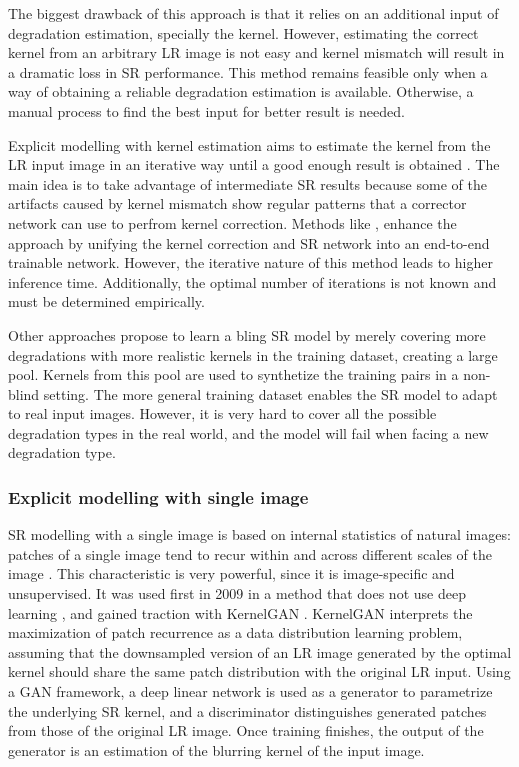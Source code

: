         The biggest drawback  of this approach is that it relies on an additional input of degradation estimation, specially the kernel. 
        However, estimating the correct kernel from an arbitrary LR image is not easy and kernel mismatch will result in a dramatic loss in SR performance.
        This method remains feasible only when a way of obtaining a reliable degradation estimation is available.
        Otherwise, a manual process to find the best input for better result is needed.
        
        Explicit modelling with kernel estimation aims to estimate the kernel from the LR input image in an iterative way until a good enough result is obtained \cite{gu2019blind}.
        The main idea is to take advantage of intermediate SR results because some of the artifacts caused by kernel mismatch show regular patterns that a corrector network can use to perfrom kernel correction.
        Methods like \cite{luo2020unfolding}, enhance the approach by unifying the kernel correction and SR network into an end-to-end trainable network. 
        However, the iterative nature of this method leads to higher inference time. Additionally, the optimal number of iterations is not known and must be determined empirically.

        Other approaches propose to learn a bling SR model by merely covering more degradations with more realistic kernels in the training dataset, creating a large pool.
        Kernels from this pool are used to synthetize the training pairs in a non-blind setting. 
        The more general training dataset enables the SR model to adapt to real input images. 
        However, it is very hard to cover all the possible degradation types in the real world, and the model will fail when facing a new degradation type.


        \subsubsection{Explicit modelling with single image}

        SR modelling with a single image is based on internal statistics of natural images: patches of a single image tend to recur within and across different scales of the image \cite{zontak2011}.
        This characteristic is very powerful, since it is image-specific and unsupervised. It was used first in 2009 in a method that does not use deep learning \cite{glasner2009}, and gained traction with KernelGAN \cite{bellkligler2020blind}. 
        KernelGAN interprets the maximization of patch recurrence as a data distribution learning problem, assuming that the downsampled version of an LR image generated by the optimal kernel should share the same patch distribution with the original LR input.
        Using a GAN framework, a deep linear network is used as a generator to parametrize the underlying SR kernel, and a discriminator distinguishes generated patches from those of the original LR image.
        Once training finishes, the output of the generator is an estimation of the blurring kernel of the input image. 

